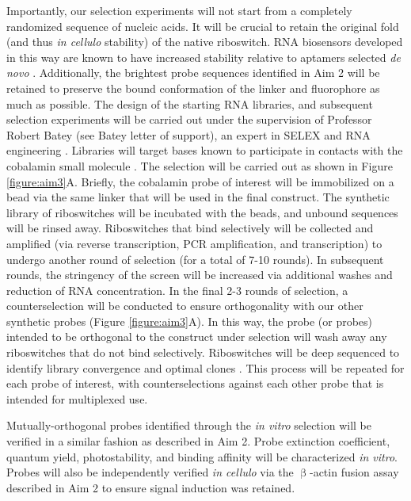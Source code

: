 Importantly, our selection experiments will not start from a completely randomized sequence of nucleic acids. It will be crucial to retain the original fold (and thus \textit{in cellulo} stability) of the native riboswitch. RNA biosensors developed in this way are known to have increased stability relative to aptamers selected \textit{de novo} \cite{PorterRecurrentRNAmotifs2017}.
Additionally, the brightest probe sequences identified in Aim 2 will be retained to preserve the bound conformation of the linker and fluorophore as much as possible.
The design of the starting RNA libraries, and subsequent selection experiments will be carried out under the supervision of Professor Robert Batey (see Batey letter of support), an expert in SELEX and RNA engineering \cite{TrauschChapterThreeDesign2015,PorterRecurrentRNAmotifs2017}.
Libraries will target bases known to participate in contacts with the cobalamin small molecule \cite{JohnsonJrB12cofactorsdirectly2012,PorterRecurrentRNAmotifs2017}.
The selection will be carried out as shown in Figure \ref{figure:aim3}A. Briefly, the cobalamin probe of interest will be immobilized on a bead via the same linker that will be used in the final construct.
The synthetic library of riboswitches will be incubated with the beads, and unbound sequences will be rinsed away.
Riboswitches that bind selectively will be collected and amplified (via reverse transcription, PCR amplification, and transcription) to undergo another round of selection (for a total of 7-10 rounds).
In subsequent rounds, the stringency of the screen will be increased via additional washes and reduction of RNA concentration.
In the final 2-3 rounds of selection, a counterselection will be conducted to ensure orthogonality with our other synthetic probes (Figure \ref{figure:aim3}A). In this way, the probe (or probes) intended to be orthogonal to the construct under selection will wash away any riboswitches that do not bind selectively.
Riboswitches will be deep sequenced to identify library convergence and optimal clones \cite{PorterRecurrentRNAmotifs2017}. This process will be repeated for each probe of interest, with counterselections against each other probe that is intended for multiplexed use.

Mutually-orthogonal probes identified through the \textit{in vitro} selection will be verified in a similar fashion as described in Aim 2. Probe extinction coefficient, quantum yield, photostability, and binding affinity will be characterized \textit{in vitro}. Probes will also be independently verified \textit{in cellulo} via the $\upbeta$-actin fusion assay described in Aim 2 to ensure signal induction was retained.

